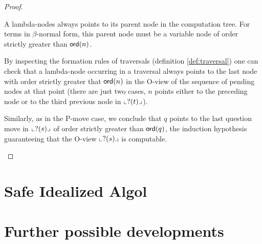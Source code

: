 \begin{proof}
\begin{itemize}
A lambda-nodes always points to its parent node in the computation
tree. For terms in $\beta$-normal form, this parent node must be a
variable node of order strictly greater than ${\sf ord}(n)$.

By inspecting the formation rules of traversals (definition
\ref{def:traversal}) one can check that a lambda-node occurring in a
traversal always points to the last node with order strictly greater
that ${\sf ord}(n)$ in the O-view of the sequence of pending nodes at
that point (there are just two cases, $n$ points either to the
preceding node or to the third previous node in $\llcorner ?(t) \lrcorner$).

Similarly, as in the P-move case, we conclude that $q$ points to the
last question move in $\llcorner ?(s) \lrcorner$ of order strictly greater than
${\sf ord}(q)$, the induction hypothesis guaranteeing that the O-view
$\llcorner ?(s) \lrcorner$ is computable.

\end{itemize}

\end{proof}



\section{Safe Idealized Algol}



\section{Further possible developments}
